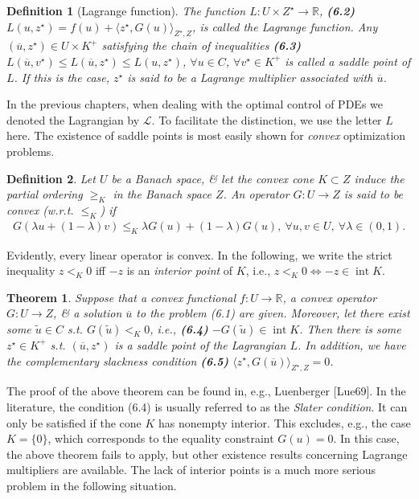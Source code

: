 \documentclass[oneside]{book}
\numberwithin{equation}{section}
\newtheorem{definition}{Definition}[chapter]
\newtheorem{theorem}{Theorem}[chapter]
\begin{document}
\begin{definition}[Lagrange function]
	The function $L:U\times Z^\star\to\mathbb{R}$, \textbf{(6.2)} $L(u,z^\star) = f(u) + \langle z^\star,G(u)\rangle_{Z^\star,Z}$, is called the \emph{Lagrange function}. Any $(\overline{u},z^\star)\in U\times K^+$ satisfying the chain of inequalities \textbf{(6.3)} $L(\overline{u},v^\star)\le L(\overline{u},z^\star)\le L(u,z^\star)$, $\forall u\in C$, $\forall v^\star\in K^+$ is called a \emph{saddle point} of $L$. If this is the case, $z^\star$ is said to be a \emph{Lagrange multiplier} associated with $\overline{u}$.
\end{definition}
In the previous chapters, when dealing with the optimal control of PDEs we denoted the Lagrangian by $\mathcal{L}$. To facilitate the distinction, we use the letter $L$ here. The existence of saddle points is most easily shown for \textit{convex} optimization problems.

\begin{definition}
	Let $U$ be a Banach space, \& let the convex cone $K\subset Z$ induce the partial ordering $\ge_K$ in the Banach space $Z$. An operator $G:U\to Z$ is said to be \emph{convex} (w.r.t. $\le_K$) if
	\begin{align*}
		G(\lambda u + (1 - \lambda)v)\le_K\lambda G(u) + (1 - \lambda)G(u),\ \forall u,v\in U,\ \forall\lambda\in(0,1).
	\end{align*}
\end{definition}
Evidently, every linear operator is convex. In the following, we write the strict inequality $z <_K 0$ iff $-z$ is an \textit{interior point} of $K$, i.e., $z <_K 0\Leftrightarrow-z\in\operatorname{int}K$.

\begin{theorem}
	Suppose that a convex functional $f:U\to\mathbb{R}$, a convex operator $G:U\to Z$, \& a solution $\overline{u}$ to the problem (6.1) are given. Moreover, let there exist some $\widetilde{u}\in C$ s.t. $G(\widetilde{u}) <_K 0$, i.e., \textbf{(6.4)} $-G(\widetilde{u})\in\operatorname{int} K$. Then there is some $z^\star\in K^+$ s.t. $(\overline{u},z^\star)$ is a saddle point of the Lagrangian $L$. In addition, we have the complementary slackness condition \textbf{(6.5)} $\langle z^\star,G(\overline{u})\rangle_{Z^\star,Z} = 0$.
\end{theorem}
The proof of the above theorem can be found in, e.g., Luenberger [Lue69]. In the literature, the condition (6.4) is usually referred to as the \textit{Slater condition}. It can only be satisfied if the cone $K$ has nonempty interior. This excludes, e.g., the case $K = \{0\}$, which corresponds to the equality constraint $G(u) = 0$. In this case, the above theorem fails to apply, but other existence results concerning Lagrange multipliers are available. The lack of interior points is a much more serious problem in the following situation.
\end{document}
